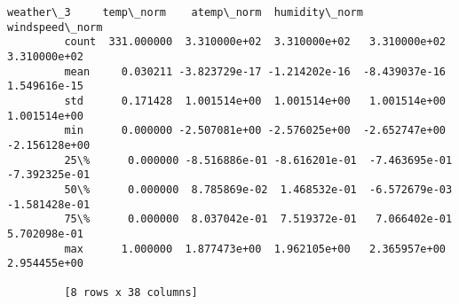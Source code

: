\documentclass[11pt]{article}
\begin{document}
\begin{Verbatim}[commandchars=\\\{\}]
                 weather\_3     temp\_norm    atemp\_norm  humidity\_norm  windspeed\_norm  
         count  331.000000  3.310000e+02  3.310000e+02   3.310000e+02    3.310000e+02  
         mean     0.030211 -3.823729e-17 -1.214202e-16  -8.439037e-16    1.549616e-15  
         std      0.171428  1.001514e+00  1.001514e+00   1.001514e+00    1.001514e+00  
         min      0.000000 -2.507081e+00 -2.576025e+00  -2.652747e+00   -2.156128e+00  
         25\%      0.000000 -8.516886e-01 -8.616201e-01  -7.463695e-01   -7.392325e-01  
         50\%      0.000000  8.785869e-02  1.468532e-01  -6.572679e-03   -1.581428e-01  
         75\%      0.000000  8.037042e-01  7.519372e-01   7.066402e-01    5.702098e-01  
         max      1.000000  1.877473e+00  1.962105e+00   2.365957e+00    2.954455e+00  
         
         [8 rows x 38 columns]
\end{Verbatim}
            
\end{document}
